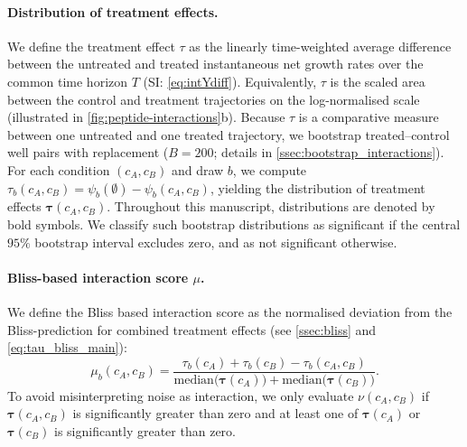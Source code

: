 \paragraph{Distribution of treatment effects.}
We define the treatment effect $\tau$ as the linearly time-weighted average difference between the untreated and treated instantaneous net growth rates over the common time horizon \(T\) (SI: \autoref{eq:intYdiff}).
Equivalently, \(\tau\) is the scaled area between the control and treatment trajectories on the log-normalised scale (illustrated in \autoref{fig:peptide-interactions}b).
Because \(\tau\) is a comparative measure between one untreated and one treated trajectory, we bootstrap treated--control well pairs with replacement (\(B=200\); details in \autoref{ssec:bootstrap_interactions}).
For each condition \((c_A,c_B)\) and draw \(b\), we compute \(\tau_b(c_A,c_B)=\psi_b(\emptyset)-\psi_b(c_A,c_B)\), yielding the distribution of treatment effects $\symbf{\tau}(c_A, c_B)$.
Throughout this manuscript, distributions are denoted by bold symbols.
We classify such bootstrap distributions as significant if the central \(95\%\) bootstrap interval excludes zero, and as not significant otherwise.

\paragraph{Bliss-based interaction score \(\mu\).}
We define the Bliss based interaction score as the normalised deviation from the Bliss-prediction for combined treatment effects (see \autoref{ssec:bliss} and \autoref{eq:tau_bliss_main}):
\begin{equation}
  \mu_b(c_A,c_B)  =
  \frac{\tau_b(c_A)+\tau_b(c_B)-\tau_b(c_A,c_B)}
  {\mathrm{median}\!\bigl(\symbf{\tau}(c_A)\bigr)+\mathrm{median}\!\bigl(\symbf{\tau}(c_B)\bigr)}.
  \label{eq:mu}
\end{equation}
To avoid misinterpreting noise as interaction, we only evaluate \(\nu(c_A,c_B)\) if \(\symbf{\tau}(c_A,c_B)\) is significantly greater than zero and at least one of \(\symbf{\tau}(c_A)\) or \(\symbf{\tau}(c_B)\) is significantly greater than zero.

